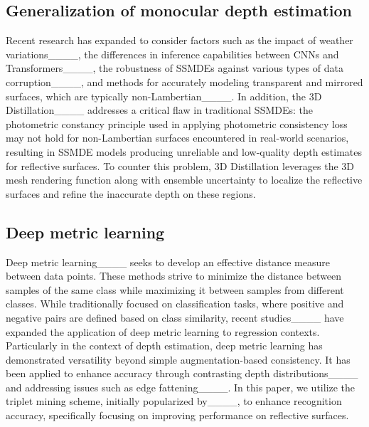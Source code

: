 \subsection{Generalization of monocular depth estimation}
\label{sec:rel_genmono}
Recent research has expanded to consider factors such as the impact of weather variations____, the differences in inference capabilities between CNNs and Transformers____, the robustness of SSMDEs against various types of data corruption____, and methods for accurately modeling transparent and mirrored surfaces, which are typically non-Lambertian____.
In addition, the 3D Distillation____ addresses a critical flaw in traditional SSMDEs: the photometric constancy principle used in applying photometric consistency loss may not hold for non-Lambertian surfaces encountered in real-world scenarios, resulting in SSMDE models producing unreliable and low-quality depth estimates for reflective surfaces.
To counter this problem, 3D Distillation leverages the 3D mesh rendering function along with ensemble uncertainty to localize the reflective surfaces and refine the inaccurate depth on these regions.

\subsection{Deep metric learning}
\label{sec:rel_deep_metric}
Deep metric learning____ seeks to develop an effective distance measure between data points.
These methods strive to minimize the distance between samples of the same class while maximizing it between samples from different classes.
While traditionally focused on classification tasks, where positive and negative pairs are defined based on class similarity, recent studies____ have expanded the application of deep metric learning to regression contexts.
Particularly in the context of depth estimation, deep metric learning has demonstrated versatility beyond simple augmentation-based consistency.
It has been applied to enhance accuracy through contrasting depth distributions____ and addressing issues such as edge fattening____.
In this paper, we utilize the triplet mining scheme, initially popularized by____, to enhance recognition accuracy, specifically focusing on improving performance on reflective surfaces.